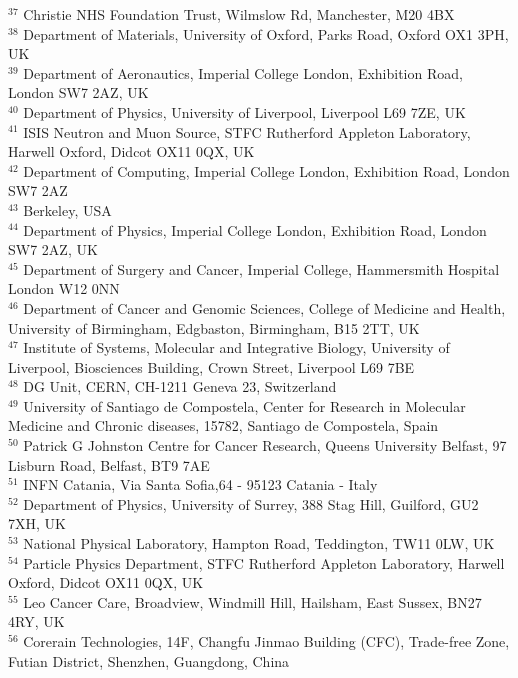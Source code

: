 {\begin{tabbing}
     $^{37}$ \> Christie NHS Foundation Trust, Wilmslow Rd, Manchester, M20 4BX\\
     $^{38}$ \> Department of Materials, University of Oxford, Parks Road, Oxford OX1 3PH, UK\\
     $^{39}$ \> Department of Aeronautics, Imperial College London, Exhibition Road, London SW7 2AZ, UK\\
     $^{40}$ \> Department of Physics, University of Liverpool, Liverpool L69 7ZE, UK\\
     $^{41}$ \> ISIS Neutron and Muon Source, STFC Rutherford Appleton Laboratory, Harwell Oxford, Didcot OX11 0QX, UK\\
     $^{42}$ \> Department of Computing, Imperial College London, Exhibition Road, London SW7 2AZ\\
     $^{43}$ \> Berkeley, USA\\
     $^{44}$ \> Department of Physics, Imperial College London, Exhibition Road, London SW7 2AZ, UK\\
     $^{45}$ \> Department of Surgery and Cancer, Imperial College, Hammersmith Hospital London W12 0NN\\
     $^{46}$ \> Department of Cancer and Genomic Sciences, College of Medicine and Health, University of Birmingham, Edgbaston, Birmingham, B15 2TT, UK\\
     $^{47}$ \> Institute of Systems, Molecular and Integrative Biology, University of Liverpool, Biosciences Building, Crown Street, Liverpool L69 7BE\\
     $^{48}$ \> DG Unit, CERN, CH-1211 Geneva 23, Switzerland\\
     $^{49}$ \> University of Santiago de Compostela, Center for Research in Molecular Medicine and Chronic diseases, 15782, Santiago de Compostela, Spain\\
     $^{50}$ \> Patrick G Johnston Centre for Cancer Research, Queens University Belfast, 97 Lisburn Road, Belfast, BT9 7AE\\
     $^{51}$ \> INFN Catania, Via Santa Sofia,64 - 95123 Catania - Italy\\
     $^{52}$ \> Department of Physics, University of Surrey, 388 Stag Hill, Guilford, GU2 7XH, UK\\
     $^{53}$ \> National Physical Laboratory, Hampton Road, Teddington, TW11 0LW, UK\\
     $^{54}$ \> Particle Physics Department, STFC Rutherford Appleton Laboratory, Harwell Oxford, Didcot OX11 0QX, UK\\
     $^{55}$ \> Leo Cancer Care, Broadview, Windmill Hill, Hailsham, East Sussex, BN27 4RY, UK\\
     $^{56}$ \> Corerain Technologies, 14F, Changfu Jinmao Building (CFC), Trade-free Zone, Futian District, Shenzhen, Guangdong, China\\
    ~   \> \\
  \end{tabbing}
}
